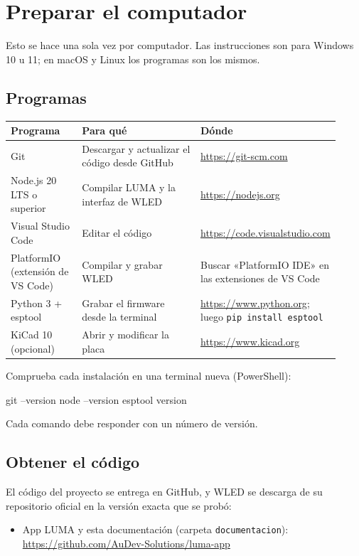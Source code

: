 \chapter{Preparar el computador}\label{cap:pc}

Esto se hace una sola vez por computador. Las instrucciones son para Windows 10 u 11; en macOS y Linux los programas son los mismos.

\section{Programas}

\begin{longtable}{@{}>{\raggedright\arraybackslash}p{0.22\linewidth} >{\raggedright\arraybackslash}p{0.38\linewidth} >{\raggedright\arraybackslash}p{0.32\linewidth}@{}}
\toprule
\textbf{Programa} & \textbf{Para qué} & \textbf{Dónde} \\ \midrule \endhead
Git & Descargar y actualizar el código desde GitHub & \url{https://git-scm.com} \\
Node.js 20 LTS o superior & Compilar LUMA y la interfaz de WLED & \url{https://nodejs.org} \\
Visual Studio Code & Editar el código & \url{https://code.visualstudio.com} \\
PlatformIO (extensión de VS Code) & Compilar y grabar WLED & Buscar «PlatformIO IDE» en las extensiones de VS Code \\
Python 3 + esptool & Grabar el firmware desde la terminal & \url{https://www.python.org}; luego \texttt{pip install esptool} \\
KiCad 10 (opcional) & Abrir y modificar la placa & \url{https://www.kicad.org} \\
\bottomrule
\end{longtable}

Comprueba cada instalación en una terminal nueva (PowerShell):
\begin{comando}
git --version
node --version
esptool version
\end{comando}
Cada comando debe responder con un número de versión.

\section{Obtener el código}

El código del proyecto se entrega en GitHub, y WLED se descarga de su repositorio oficial en la versión exacta que se probó:
\begin{itemize}
\item App LUMA y esta documentación (carpeta \texttt{documentacion}): \url{https://github.com/AuDev-Solutions/luma-app}
\end{itemize}

